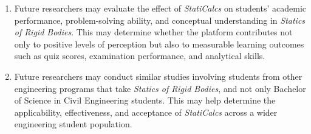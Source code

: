 \begin{enumerate}
\item Future researchers may evaluate the effect of \textit{StatiCalcs} on students’ academic performance, problem-solving ability, and conceptual understanding in \textit{Statics of Rigid Bodies}. This may determine whether the platform contributes not only to positive levels of perception but also to measurable learning outcomes such as quiz scores, examination performance, and analytical skills.

\item Future researchers may conduct similar studies involving students from other engineering programs that take \textit{Statics of Rigid Bodies}, and not only Bachelor of Science in Civil Engineering students. This may help determine the applicability, effectiveness, and acceptance of \textit{StatiCalcs} across a wider engineering student population.

\end{enumerate}